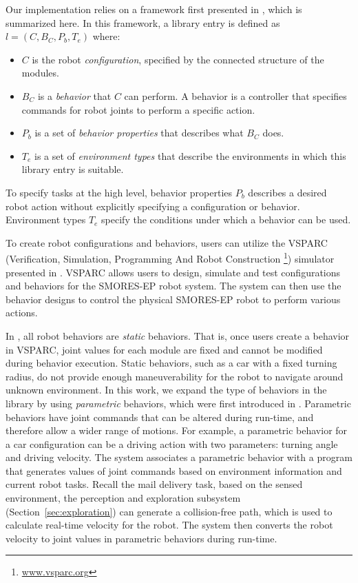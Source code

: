 \documentclass[journal]{IEEEtran}
\begin{document}
Our implementation relies on a framework first presented in \cite{Jing2016}, which is summarized here.
In this framework, a library entry is defined as $l = (C,B_C,P_b,T_e)$ where:
\begin{itemize}
\item $C$ is the robot \emph{configuration}, specified by the connected structure of the modules.
\item $B_C$ is a \emph{behavior} that $C$ can perform. A behavior is a controller that specifies commands for robot joints to perform a specific action. 
\item $P_b$ is a set of \emph{behavior properties} that describes what $B_C$ does. 
\item $T_e$ is a set of \emph{environment types} that describe the environments in which this library entry is suitable. 
\end{itemize} 
%
To specify tasks at the high level, behavior properties $P_b$ describes a desired robot action without explicitly specifying a configuration or behavior.
Environment types $T_e$ specify the conditions under which a behavior can be used.

To create robot configurations and behaviors, users can utilize the VSPARC (Verification, Simulation, Programming And Robot Construction \footnote{\url{www.vsparc.org}}) simulator presented in \cite{Jing2016}.
VSPARC allows users to design, simulate and test configurations and behaviors for the SMORES-EP robot system.
The system can then use the behavior designs to control the physical SMORES-EP robot to perform various actions.

In \cite{Jing2016}, all robot behaviors are \textit{static} behaviors.
That is, once users create a behavior in VSPARC, joint values for each module are fixed and cannot be modified during behavior execution.
Static behaviors, such as a car with a fixed turning radius, do not provide enough maneuverability for the robot to navigate around unknown environment.
In this work, we expand the type of behaviors in the library by using \textit{parametric} behaviors, which were first introduced in \cite{JingAURO2017}.
Parametric behaviors have joint commands that can be altered during run-time, and therefore allow a wider range of motions.
For example, a parametric behavior for a car configuration can be a driving action with two parameters: turning angle and driving velocity.  
The system associates a parametric behavior with a program that generates values of joint commands based on environment information and current robot tasks.
Recall the mail delivery task, based on the sensed environment, the perception and exploration subsystem (Section~\ref{sec:exploration}) can generate a collision-free path, which is used to calculate real-time velocity for the robot.
The system then converts the robot velocity to joint values in parametric behaviors during run-time.
\end{document}

